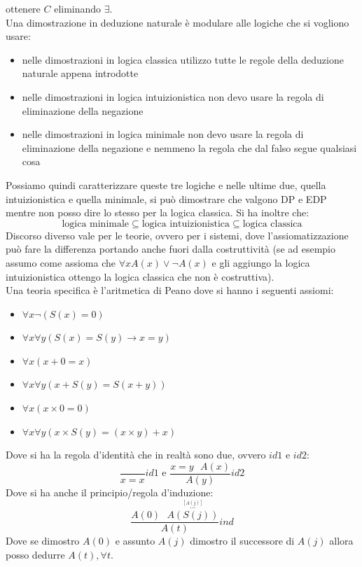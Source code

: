\documentclass[a4paper,12pt, oneside]{book}
\begin{document}
ottenere $C$ eliminando $\exists$.\\
Una dimostrazione in deduzione naturale è modulare alle logiche che si vogliono
usare:
\begin{itemize}
  \item nelle dimostrazioni in logica classica utilizzo tutte le regole della
  deduzione naturale appena introdotte
  \item nelle dimostrazioni in logica intuizionistica non devo usare la regola
  di eliminazione della negazione
  \item  nelle dimostrazioni in logica minimale non devo usare la regola
  di eliminazione della negazione e nemmeno la regola che dal falso segue
  qualsiasi cosa
\end{itemize}
Possiamo quindi caratterizzare queste tre logiche e nelle ultime due, quella
intuizionistica e quella minimale, si può dimostrare che valgono DP e EDP mentre
non posso dire lo 
stesso per la logica classica. Si ha inoltre che:
\[\mbox{logica minimale}\subseteq\mbox{logica
    intuizionistica}\subseteq\mbox{logica classica}\]
Discorso diverso vale per le teorie, ovvero per i sistemi, dove
l'assiomatizzazione può fare la differenza portando anche fuori dalla
costruttività (se ad esempio assumo come assioma che $\forall xA(x)\lor\neg
A(x)$ e gli aggiungo la logica intuizionistica ottengo la logica classica che
non è costruttiva).\\
Una teoria specifica è l'aritmetica di Peano dove si hanno i seguenti assiomi:
\begin{itemize}
  \item $\forall x\neg(S(x)=0)$
  \item $\forall x\forall y(S(x)=S(y)\to x=y)$
  \item $\forall x(x+0=x)$
  \item $\forall x\forall y(x+S(y)=S(x+y))$
  \item $\forall x(x\times 0 =0)$
  \item $\forall x\forall y(x\times S(y)=(x\times y)+x)$
\end{itemize}
Dove si ha la regola d'identità che in realtà sono due, ovvero $id1$ e $id2$:
\[\frac{}{x=x}id1\mbox{ e } \frac{x=y\,\,\,\,A(x)}{A(y)}id2\]
Dove si ha anche il principio/regola d'induzione:
\[\frac{A(0)\,\,\,\,\stackrel{\stackrel{[A(j)]}{\cdots}}{A(S(j))}}{A(t)}ind\]
Dove se dimostro $A(0)$ e assunto $A(j)$ dimostro il successore di $A(j)$ allora
posso dedurre $A(t),\forall t$.
\end{document}
